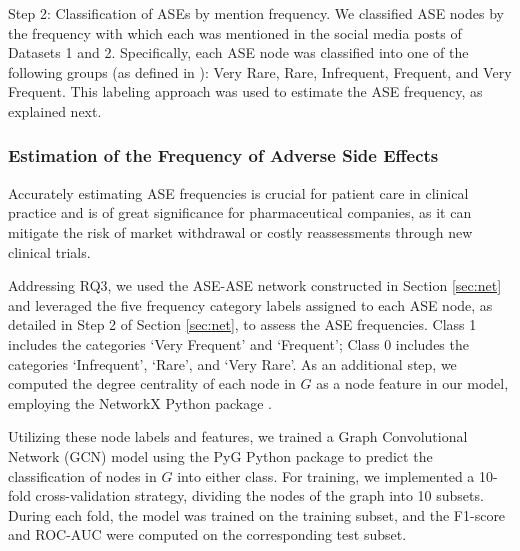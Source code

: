 \documentclass[referee,bst/sn-basic]{sn-jnl}%
\theoremstyle{thmstyletwo}%
\theoremstyle{thmstylethree}%
\begin{document}
{Step 2: Classification of ASEs by mention frequency.}
We classified ASE nodes by the frequency with which each was mentioned in the social media posts of Datasets 1 and 2. 
Specifically, each ASE node was classified into one of the following groups (as defined in \cite{galeano2020predicting}): 
Very Rare, 
Rare, 
Infrequent, 
Frequent, and 
Very Frequent. 
This labeling approach was used to estimate the ASE frequency, as explained next.

\subsubsection{Estimation of the Frequency of Adverse Side Effects}
\label{sec:pred_side_effect_freq}
Accurately estimating ASE frequencies is crucial for patient care in clinical practice and is of great significance for pharmaceutical companies, as it can mitigate the risk of market withdrawal or costly reassessments through new clinical trials.

Addressing RQ3, we used the ASE-ASE network constructed in Section \ref{sec:net} and leveraged the five frequency category labels assigned to each ASE node, as detailed in Step 2 of Section \ref{sec:net}, to assess the ASE frequencies.
Class 1 includes the categories `Very Frequent' and `Frequent';
Class 0 includes the categories `Infrequent', `Rare', and `Very Rare'. 
As an additional step, we computed the degree centrality of each node in $G$ as a node feature in our model, employing the NetworkX Python package \cite{hagberg2020networkx}. 

Utilizing these node labels and features, we trained a Graph Convolutional Network (GCN) model using the PyG Python package \cite{team2024pyg} 
to predict the classification of nodes in $G$ into either class.
For training, we implemented a 10-fold cross-validation strategy, dividing the nodes of the graph into 10 subsets. 
During each fold, the model was trained on the training subset, and the F1-score and ROC-AUC were computed on the corresponding test subset.


\end{document}
